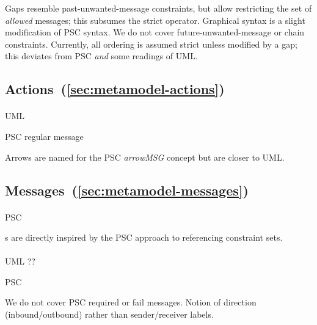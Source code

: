 Gaps resemble past-unwanted-message constraints, but
allow restricting the set of \emph{allowed} messages;
this subsumes the strict operator.  Graphical syntax is a slight
modification of PSC syntax.  We do not cover
future-unwanted-message or chain constraints.  Currently, all
ordering is assumed strict unless modified by a gap; this
deviates from PSC \emph{and} some readings of UML.
    
\subsection{Actions~(\ref{sec:metamodel-actions})}

\paragraph{\marrowaction}
\begin{featset}
\item[UML] 
\item[PSC] regular message
\end{featset}

Arrows are named for the PSC \emph{arrowMSG} concept but are closer
to UML.
      
\subsection{Messages~(\ref{sec:metamodel-messages})}

\paragraph{\mmessageset}
\begin{featset}
\item[PSC] 
\end{featset}

\mrefmessageset s are directly inspired by the PSC approach to referencing constraint sets.

\paragraph{\mmessagespec}
\begin{featset}
\item[UML] ??
\item[PSC] 
\end{featset}

We do not cover PSC required or fail messages.
Notion of direction (inbound/outbound) rather than sender/receiver labels.

